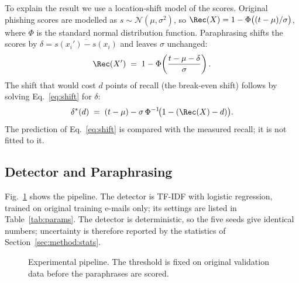 To explain the result we use a location-shift model of the scores. Original phishing scores are modelled as $s\sim\mathcal{N}(\mu,\sigma^2)$, so $\Rec(X)=1-\Phi\bigl((t-\mu)/\sigma\bigr)$, where $\Phi$ is the standard normal distribution function. Paraphrasing shifts the scores by $\delta=\overline{s(x_i')-s(x_i)}$ and leaves $\sigma$ unchanged:
\begin{equation}
  \Rec(X') \;=\; 1-\Phi\!\left(\frac{t-\mu-\delta}{\sigma}\right).
  \label{eq:shift}
\end{equation}
The shift that would cost $d$ points of recall (the break-even shift) follows by solving Eq.~\eqref{eq:shift} for $\delta$:
\begin{equation}
  \delta^{*}(d) \;=\; (t-\mu)-\sigma\,\Phi^{-1}\!\bigl(1-(\Rec(X)-d)\bigr).
  \label{eq:breakeven}
\end{equation}
The prediction of Eq.~\eqref{eq:shift} is compared with the measured recall; it is not fitted to it.

\subsection{Detector and Paraphrasing}
\label{sec:method:pipeline}
Fig.~\ref{fig:pipeline} shows the pipeline. The detector is TF-IDF with logistic regression, trained on original training e-mails only; its settings are listed in Table~\ref{tab:params}. The detector is deterministic, so the five seeds give identical numbers; uncertainty is therefore reported by the statistics of Section~\ref{sec:method:stats}.

\begin{figure}[t]
\centering
{}
\caption{Experimental pipeline. The threshold is fixed on original validation data before the paraphrases are scored.}
\label{fig:pipeline}
\end{figure}


